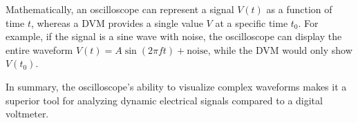 Mathematically, an oscilloscope can represent a signal \( V(t) \) as a function of time \( t \), whereas a DVM provides a single value \( V \) at a specific time \( t_0 \). For example, if the signal is a sine wave with noise, the oscilloscope can display the entire waveform \( V(t) = A \sin(2\pi ft) + \text{noise} \), while the DVM would only show \( V(t_0) \).

In summary, the oscilloscope’s ability to visualize complex waveforms makes it a superior tool for analyzing dynamic electrical signals compared to a digital voltmeter.

